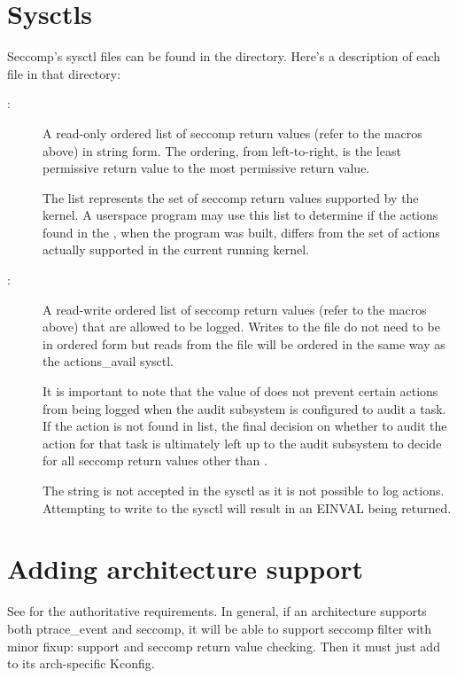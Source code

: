 \documentclass[a4paper,8pt,english]{sphinxmanual}
\begin{document}
\section{Sysctls}
\label{userspace-api/seccomp_filter:sysctls}
Seccomp's sysctl files can be found in the 
directory. Here's a description of each file in that directory:
\begin{description}
\item[{:}] \leavevmode
A read-only ordered list of seccomp return values (refer to the
 macros above) in string form. The ordering, from
left-to-right, is the least permissive return value to the most
permissive return value.

The list represents the set of seccomp return values supported
by the kernel. A userspace program may use this list to
determine if the actions found in the , when the
program was built, differs from the set of actions actually
supported in the current running kernel.

\item[{:}] \leavevmode
A read-write ordered list of seccomp return values (refer to the
 macros above) that are allowed to be logged. Writes
to the file do not need to be in ordered form but reads from the file
will be ordered in the same way as the actions\_avail sysctl.

It is important to note that the value of  does not
prevent certain actions from being logged when the audit subsystem is
configured to audit a task. If the action is not found in
 list, the final decision on whether to audit the
action for that task is ultimately left up to the audit subsystem to
decide for all seccomp return values other than .

The  string is not accepted in the  sysctl
as it is not possible to log  actions. Attempting
to write  to the sysctl will result in an EINVAL being
returned.

\end{description}


\section{Adding architecture support}
\label{userspace-api/seccomp_filter:adding-architecture-support}
See  for the authoritative requirements.  In general, if an
architecture supports both ptrace\_event and seccomp, it will be able to
support seccomp filter with minor fixup:  support and seccomp return
value checking.  Then it must just add 
to its arch-specific Kconfig.
\end{document}
